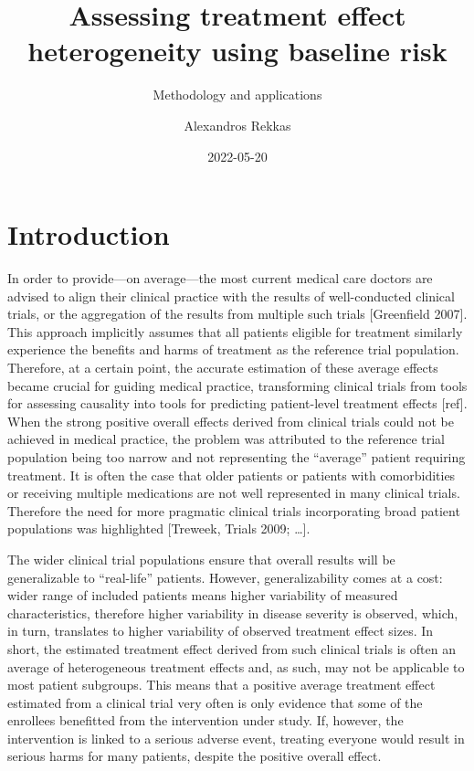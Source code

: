 \documentclass[
]{book}
\title{Assessing treatment effect heterogeneity using baseline risk}
\subtitle{Methodology and applications}
\author{Alexandros Rekkas}
\date{2022-05-20}
\begin{document}
\maketitle

{
\setcounter{tocdepth}{1}
\tableofcontents
}
\hypertarget{introduction}{%
\chapter{Introduction}\label{introduction}}

In order to provide---on average---the most current medical care doctors are
advised to align their clinical practice with the results of well-conducted
clinical trials, or the aggregation of the results from multiple such trials
{[}Greenfield 2007{]}. This approach implicitly assumes that all patients eligible
for treatment similarly experience the benefits and harms of treatment as the
reference trial population. Therefore, at a certain point, the accurate
estimation of these average effects became crucial for guiding medical practice,
transforming clinical trials from tools for assessing causality into tools for
predicting patient-level treatment effects {[}ref{]}. When the strong positive
overall effects derived from clinical trials could not be achieved in medical
practice, the problem was attributed to the reference trial population being too
narrow and not representing the ``average'' patient requiring treatment. It is
often the case that older patients or patients with comorbidities or receiving
multiple medications are not well represented in many clinical trials. Therefore
the need for more pragmatic clinical trials incorporating broad patient
populations was highlighted {[}Treweek, Trials 2009; \ldots{]}.

The wider clinical trial populations ensure that overall results will be
generalizable to ``real-life'' patients. However, generalizability comes at a
cost: wider range of included patients means higher variability of measured
characteristics, therefore higher variability in disease severity is observed,
which, in turn, translates to higher variability of observed treatment effect
sizes. In short, the estimated treatment effect derived from such clinical
trials is often an average of heterogeneous treatment effects and, as such, may
not be applicable to most patient subgroups. This means that a positive average
treatment effect estimated from a clinical trial very often is only evidence
that some of the enrollees benefitted from the intervention under study. If,
however, the intervention is linked to a serious adverse event, treating
everyone would result in serious harms for many patients, despite the positive
overall effect.
\end{document}
